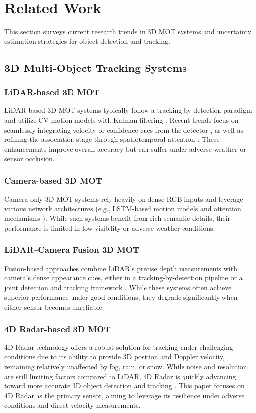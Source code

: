 \section{Related Work}
\label{sec:sec2}
This section surveys current research trends in 3D MOT systems and uncertainty estimation strategies for object detection and tracking.

\subsection{3D Multi-Object Tracking Systems}
\label{sec:sec2a}

\subsubsection{LiDAR-based 3D MOT}
LiDAR-based 3D MOT systems typically follow a tracking-by-detection paradigm and utilize CV motion models with Kalman filtering \cite{ab3dmot,probabilistic,score,simpletrack}. Recent trends focus on seamlessly integrating velocity or confidence cues from the detector \cite{centerpoint}, as well as refining the association stage through spatiotemporal attention \cite{3dmot}. These enhancements improve overall accuracy but can suffer under adverse weather or sensor occlusion.

\subsubsection{Camera-based 3D MOT}
Camera-only 3D MOT systems rely heavily on dense RGB inputs and leverage various network architectures (e.g., LSTM-based motion models \cite{mono,cc3dt} and attention mechanisms \cite{mutr3d,spatio}). While such systems benefit from rich semantic details, their performance is limited in low-visibility or adverse weather conditions.

\subsubsection{LiDAR–Camera Fusion 3D MOT}
Fusion-based approaches combine LiDAR’s precise depth measurements with camera’s dense appearance cues, either in a tracking-by-detection pipeline \cite{gnn3dmot} or a joint detection and tracking framework \cite{jmodt,alphatrack}. While these systems often achieve superior performance under good conditions, they degrade significantly when either sensor becomes unreliable.

\subsubsection{4D Radar-based 3D MOT}
4D Radar technology offers a robust solution for tracking under challenging conditions due to its ability to provide 3D position and Doppler velocity, remaining relatively unaffected by fog, rain, or snow. While noise and resolution are still limiting factors compared to LiDAR, 4D Radar is quickly advancing toward more accurate 3D object detection and tracking \cite{kradar,tj4d}. This paper focuses on 4D Radar as the primary sensor, aiming to leverage its resilience under adverse conditions and direct velocity measurements.

